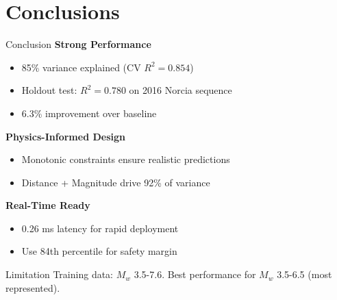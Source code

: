 \documentclass[aspectratio=169,11pt]{beamer}
\begin{document}
\section{Conclusions}

\begin{frame}{Conclusion}
\textbf{Strong Performance}
\begin{itemize}
    \item 85\% variance explained (CV $R^2 = 0.854$)
    \item Holdout test: $R^2 = 0.780$ on 2016 Norcia sequence
    \item 6.3\% improvement over baseline
\end{itemize}

\vspace{0.4cm}
\textbf{Physics-Informed Design}
\begin{itemize}
    \item Monotonic constraints ensure realistic predictions
    \item Distance + Magnitude drive 92\% of variance
\end{itemize}

\vspace{0.4cm}
\textbf{Real-Time Ready}
\begin{itemize}
    \item 0.26 ms latency for rapid deployment
    \item Use 84th percentile for safety margin
\end{itemize}

\vspace{0.3cm}
\begin{alertblock}{Limitation}
Training data: $M_w$ 3.5-7.6. Best performance for $M_w$ 3.5-6.5 (most represented).
\end{alertblock}
\end{frame}
\end{document}
